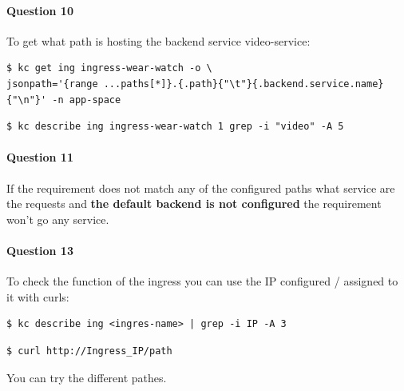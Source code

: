 \documentclass{article}
\newenvironment{blocktemplateIII}[1]{%
    \tcolorbox[beamer,%
    noparskip,breakable,
    ,colframe=Red,%
    colbacklower=LimeGreen!75!LightGreen,%
    title=#1]}%
    {\endtcolorbox}
\newenvironment{codetemplate}[1][]{%
  \mybasecolorbox[#1]
  \itshape
}{%
  \endmybasecolorbox
}
\begin{document}
\paragraph{Question 10}

To get what path is hosting the backend service video-service:

\begin{codetemplate}{}
\begin{verbatim}
$ kc get ing ingress-wear-watch -o \
jsonpath='{range ...paths[*]}.{.path}{"\t"}{.backend.service.name}{"\n"}' -n app-space
\end{verbatim}
\end{codetemplate}

\begin{codetemplate}{}
\begin{verbatim}
$ kc describe ing ingress-wear-watch 1 grep -i "video" -A 5
\end{verbatim}
\end{codetemplate}

\paragraph{Question 11}

\begin{blocktemplateIII}{WARNING}
If the requirement does not match any of the configured paths what service are the requests and \textbf{the default backend is not configured} the requirement won't go any service.
\end{blocktemplateIII}

\paragraph{Question 13}
To check the function of the ingress you can use the IP configured / assigned to it with curls:

\begin{codetemplate}{}
\begin{verbatim}
$ kc describe ing <ingres-name> | grep -i IP -A 3
\end{verbatim}
\end{codetemplate}

\begin{codetemplate}{}
\begin{verbatim}
$ curl http://Ingress_IP/path
\end{verbatim}
\end{codetemplate}

You can try the different pathes.
\end{document}
